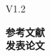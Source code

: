 \def\allfiles{}


{\huge V1.2}

\thispagestyle{empty} %
\vspace{-1em}
\newpage
\tableofcontents
\noindent\textbf{参考文献}\\
\noindent\textbf{发表论文}







% 

\clearpage
\printbibliography
